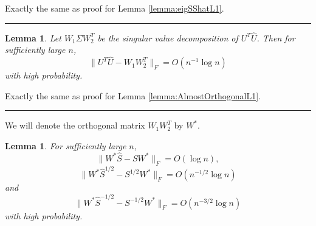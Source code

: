 \documentclass[a4paper]{article}
\newenvironment{proof}{{\bf Proof:  }}{\hfill\rule{2mm}{2mm}}
\newtheorem{lemma}[fact]{Lemma}
\begin{document}
\noindent
\begin{proof}
Exactly the same as proof for Lemma \ref{lemma:eigSShatL1}.
\end{proof}


\begin{lemma}
\label{lemma:AlmostOrthogonal}
Let $W_1 \Sigma W_2^T$ be the singular value decomposition of $U^T \hat{U}$. Then for sufficiently large $n$, 
\[
	\| U^T \hat{U} - W_1 W_2^T \|_F = O(n^{-1} \log n)
\]
with high probability.
\end{lemma}
\begin{proof}
Exactly the same as proof for Lemma \ref{lemma:AlmostOrthogonalL1}.
\end{proof}

We will denote the orthogonal matrix $W_1 W_2^T$ by $W^*$.
\begin{lemma}
\label{lemma:exchange}
For sufficiently large $n$,
\[
	\| W^* \hat{S} - S W^* \|_F = O(\log n),
\]
\[
	\|W^* \hat{S}^{1/2} - S^{1/2} W^* \|_F = O(n^{-1/2} \log n)
\]
and
\[
	\| W^* \hat{S}^{-1/2} - S^{-1/2} W^* \|_F = O(n^{-3/2} \log n)
\]
with high probability.
\end{lemma}
\end{document}
